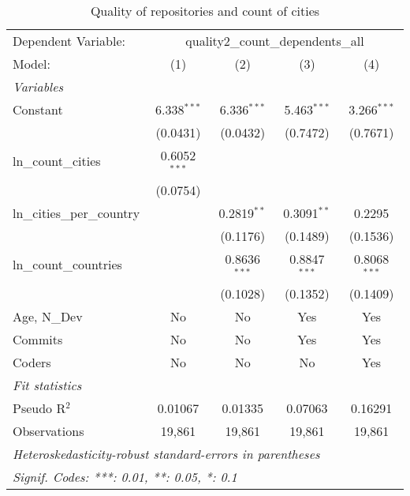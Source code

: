 
\begin{table}[htbp]
   \caption{Quality of repositories and count of cities}
   \centering
   \begin{tabular}{lcccc}
      \tabularnewline \midrule \midrule
      Dependent Variable: & \multicolumn{4}{c}{quality2\_count\_dependents\_all}\\
      Model:                      & (1)            & (2)            & (3)            & (4)\\  
      \midrule
      \emph{Variables}\\
      Constant                    & 6.338$^{***}$  & 6.336$^{***}$  & 5.463$^{***}$  & 3.266$^{***}$\\   
                                  & (0.0431)       & (0.0432)       & (0.7472)       & (0.7671)\\   
      ln\_count\_cities           & 0.6052$^{***}$ &                &                &   \\   
                                  & (0.0754)       &                &                &   \\   
      ln\_cities\_per\_country    &                & 0.2819$^{**}$  & 0.3091$^{**}$  & 0.2295\\   
                                  &                & (0.1176)       & (0.1489)       & (0.1536)\\   
      ln\_count\_countries        &                & 0.8636$^{***}$ & 0.8847$^{***}$ & 0.8068$^{***}$\\   
                                  &                & (0.1028)       & (0.1352)       & (0.1409)\\   
      Age, N\_Dev                 & No             & No             & Yes            & Yes\\  
      Commits                     & No             & No             & Yes            & Yes\\  
      Coders                      & No             & No             & No             & Yes\\  
      \midrule
      \emph{Fit statistics}\\
      Pseudo R$^2$                & 0.01067        & 0.01335        & 0.07063        & 0.16291\\  
      Observations                & 19,861         & 19,861         & 19,861         & 19,861\\  
      \midrule \midrule
      \multicolumn{5}{l}{\emph{Heteroskedasticity-robust standard-errors in parentheses}}\\
      \multicolumn{5}{l}{\emph{Signif. Codes: ***: 0.01, **: 0.05, *: 0.1}}\\
   \end{tabular}
\end{table}



